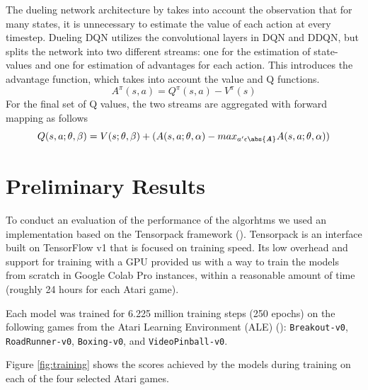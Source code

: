 \documentclass{article}
\begin{document}
The dueling network architecture by \cite{wang2016dueling} takes into account the 
observation that for many states, it is unnecessary to estimate the value of each 
action at every timestep. Dueling DQN utilizes the convolutional layers in DQN and 
DDQN, but splits the network into two different streams: one for the estimation of
state-values and one for estimation of advantages for each action. This introduces 
the advantage function, which takes into account the value and Q functions.
\begin{equation}
    A^{\pi}(s, a) = Q^{\pi}(s,a) - V^{\pi}(s)
\end{equation}
For the final set of Q values, the two streams are aggregated with forward mapping
as follows
\begin{equation}
    Q(s,a; \theta, \beta)  = V(s; \theta, \beta) + (A(s, a; \theta, \alpha) - 
    max_{a' \epsilon \abs{\textbf{\textit{A}}}} A(s, a; \theta, \alpha))
\end{equation}



\section{Preliminary Results}
To conduct an evaluation of the performance of the algorhtms we used an
implementation based on the Tensorpack framework (\cite{wu2016tensorpack}).
Tensorpack is an interface built on TensorFlow v1 that is focused on training
speed. Its low overhead and support for training with a GPU provided us with a
way to train the models from scratch in Google Colab Pro instances, within a
reasonable amount of time (roughly 24 hours for each Atari game).

Each model was trained for 6.225 million training steps (250 epochs) on the
following games from the Atari Learning Environment (ALE)
(\cite{bellemare2013arcade}): \texttt{Breakout-v0}, \texttt{RoadRunner-v0},
\texttt{Boxing-v0}, and \texttt{VideoPinball-v0}.

Figure \ref{fig:training} shows the scores achieved by the models during
training on each of the four selected Atari games.
\end{document}
